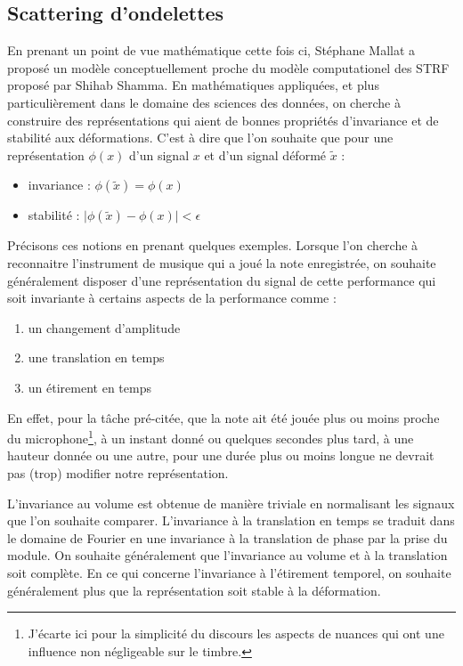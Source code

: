 \subsection{Scattering d'ondelettes}  \label{sec:scattering}

En prenant un point de vue mathématique cette fois ci, Stéphane Mallat a proposé un modèle conceptuellement proche du modèle computationel des STRF proposé par Shihab Shamma. En mathématiques appliquées, et plus particulièrement dans le domaine des sciences des données, on cherche à construire des représentations qui aient de bonnes propriétés d'invariance et de stabilité aux déformations. C'est à dire que l'on souhaite que pour une représentation $\phi(x)$ d'un signal $x$ et d'un signal déformé $\tilde x$ :
\begin{itemize}
  \item invariance : $\phi(\tilde x) = \phi(x)$
  \item stabilité : $ \vert \phi(\tilde x) - \phi(x) | < \epsilon $
\end{itemize}

Précisons ces notions en prenant quelques exemples. Lorsque l'on cherche à reconnaitre l'instrument de musique qui a joué la note enregistrée, on souhaite généralement disposer d'une représentation du signal de cette performance qui soit invariante à certains aspects de la performance comme :
\begin{enumerate}
  \item un changement d'amplitude
  \item une translation en temps
  \item un étirement en temps
\end{enumerate}
En effet, pour la tâche pré-citée, que la note ait été jouée plus ou moins proche du microphone\footnote{J'écarte ici pour la simplicité du discours les aspects de nuances qui ont une influence non négligeable sur le timbre.}, à un instant donné ou quelques secondes plus tard, à une hauteur donnée ou une autre, pour une durée plus ou moins longue ne devrait pas (trop) modifier notre représentation.

L'invariance au volume est obtenue de manière triviale en normalisant les signaux que l'on souhaite comparer. L'invariance à la translation en temps se traduit dans le domaine de Fourier en une invariance à la translation de phase par la prise du module. On souhaite généralement que l'invariance au volume et à la translation soit complète. En ce qui concerne l'invariance à l'étirement temporel, on souhaite généralement plus que la représentation soit stable à la déformation.

